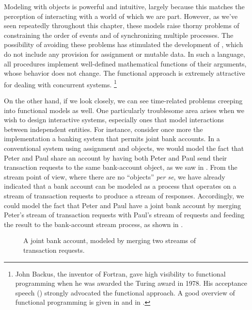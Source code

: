 Modeling with objects is powerful and intuitive, largely because this matches the perception of interacting with a world of which we are part.
However, as we’ve seen repeatedly throughout this chapter, these models raise thorny problems of constraining the order of events and of synchronizing multiple processes.
The possibility of avoiding these problems has stimulated the development of , which do not include any provision for assignment or mutable data.
In such a language, all procedures implement well-defined mathematical functions of their arguments, whose behavior does not change.
The functional approach is extremely attractive for dealing with concurrent systems.%
\footnote{
	John Backus, the inventor of Fortran, gave high visibility to functional programming when he was awarded the  Turing award in 1978.
	His acceptance speech (\autocite{backus_liberated_neumann}) strongly advocated the functional approach.
	A good overview of functional programming is given in  and in \autocite{darlington_et_al_functional_programming_applications}.
}

On the other hand, if we look closely, we can see time-related problems creeping into functional models as well.
One particularly troublesome area arises when we wish to design interactive systems, especially ones that model interactions between independent entities.
For instance, consider once more the implementation a banking system that permits joint bank accounts.
In a conventional system using assignment and objects, we would model the fact that Peter and Paul share an account by having both Peter and Paul send their transaction requests to the same bank-account object, as we saw in .
From the stream point of view, where there are no “objects” \emph{per se}, we have already indicated that a bank account can be modeled as a process that operates on a stream of transaction requests to produce a stream of responses.
Accordingly, we could model the fact that Peter and Paul have a joint bank account by merging Peter’s stream of transaction requests with Paul’s stream of requests and feeding the result to the bank-account stream process, as shown in .

\begin{figure}[tb]
	\centering
	
	\caption{
		A joint bank account, modeled by merging two streams of transaction requests.
	}
	\label{Figure 3.38}
\end{figure}


